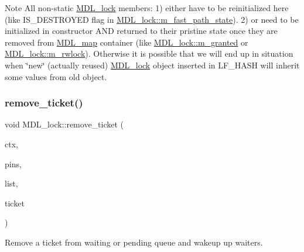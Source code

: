\begin{DoxyNote}{Note}
All non-\/static \mbox{\hyperlink{classMDL__lock}{M\+D\+L\+\_\+lock}} members\+: 1) either have to be reinitialized here (like I\+S\+\_\+\+D\+E\+S\+T\+R\+O\+Y\+ED flag in \mbox{\hyperlink{classMDL__lock_ae680877b7079a862d294ccbefed6372c}{M\+D\+L\+\_\+lock\+::m\+\_\+fast\+\_\+path\+\_\+state}}). 2) or need to be initialized in constructor A\+ND returned to their pristine state once they are removed from \mbox{\hyperlink{classMDL__map}{M\+D\+L\+\_\+map}} container (like \mbox{\hyperlink{classMDL__lock_a188dd53561f6cf6148277512b706ea74}{M\+D\+L\+\_\+lock\+::m\+\_\+granted}} or \mbox{\hyperlink{classMDL__lock_a1308b4506d8cb6d754b4f173e3aa4962}{M\+D\+L\+\_\+lock\+::m\+\_\+rwlock}}). Otherwise it is possible that we will end up in situation when \char`\"{}new\char`\"{} (actually reused) \mbox{\hyperlink{classMDL__lock}{M\+D\+L\+\_\+lock}} object inserted in L\+F\+\_\+\+H\+A\+SH will inherit some values from old object. 
\end{DoxyNote}
\mbox{\label{classMDL__lock_a7100ea62bb9af3e959d8a81ba11d4bcb}} 
\subsubsection{\texorpdfstring{remove\+\_\+ticket()}{remove\_ticket()}}
{\footnotesize\ttfamily void M\+D\+L\+\_\+lock\+::remove\+\_\+ticket (\begin{DoxyParamCaption}\item[{\mbox{\hyperlink{classMDL__context}{M\+D\+L\+\_\+context}} $\ast$}]{ctx,  }\item[{L\+F\+\_\+\+P\+I\+NS $\ast$}]{pins,  }\item[{\mbox{\hyperlink{classMDL__lock_1_1Ticket__list}{Ticket\+\_\+list}} M\+D\+L\+\_\+lock\+::$\ast$}]{list,  }\item[{\mbox{\hyperlink{classMDL__ticket}{M\+D\+L\+\_\+ticket}} $\ast$}]{ticket }\end{DoxyParamCaption})}

Remove a ticket from waiting or pending queue and wakeup up waiters. \mbox{\label{classMDL__lock_a07003cc6619a99b6cc36f564c62e4e94}} 

